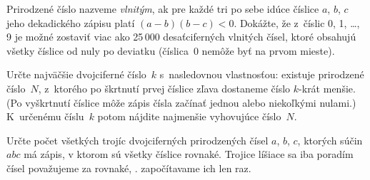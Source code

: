{Prirodzené číslo nazveme {\it vlnitým}, ak pre každé tri po sebe
idúce číslice $a$, $b$, $c$ jeho
dekadického zápisu platí ${(a-b)(b-c)<0}$. Dokážte, že z~číslic 0, 1, \dots, 9 je
možné zostaviť viac ako 25\,000
desaťciferných vlnitých čísel, ktoré obsahujú všetky číslice od nuly po
deviatku (číslica~0 nemôže byť na prvom mieste).
\vpravo{[56--B--II--3]}

Určte najväčšie dvojciferné číslo~$k$ s~nasledovnou vlastnosťou: existuje
prirodzené číslo~$N$, z~ktorého po
škrtnutí prvej číslice zľava dostaneme číslo $k$-krát menšie. (Po vyškrtnutí
číslice môže zápis čísla začínať
jednou alebo niekoľkými nulami.) K~určenému číslu~$k$ potom nájdite najmenšie
vyhovujúce číslo~$N$.
\vpravo{[56--C--II--4]}

Určte počet všetkých trojíc dvojciferných prirodzených čísel $a$, $b$, $c$,
ktorých súčin $abc$ má zápis,
v ktorom sú všetky číslice rovnaké. Trojice líšiace sa iba poradím čísel
považujeme za rovnaké,
\tj. započítavame ich len raz.
\vpravo{[54--C--I--5]}
}

